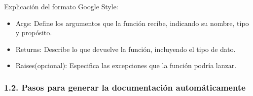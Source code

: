 \documentclass[a4paper,10pt,spanish]{sphinxmanual}
\begin{document}
\sphinxAtStartPar
Explicación del formato Google Style:
\begin{itemize}
\item {} 
\sphinxAtStartPar
Args: Define los argumentos que la función recibe, indicando su nombre, tipo y propósito.

\item {} 
\sphinxAtStartPar
Returns: Describe lo que devuelve la función, incluyendo el tipo de dato.

\item {} 
\sphinxAtStartPar
Raises(opcional): Especifica las excepciones que la función podría lanzar.

\end{itemize}


\subsubsection{1.2. Pasos para generar la documentación automáticamente}
\end{document}
